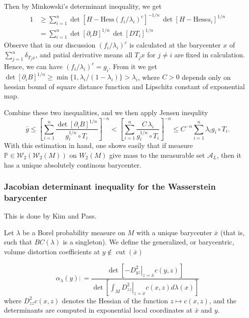 Then by Minkowski's determinant inequality, we get
\begin{align*}
	1 & \geq \sum_{i=1}^{n} \det [H-\text{Hess}(f_i/\lambda_i)^c]^{-1/n}\,\det[H-\text{Hess}u_i]^{1/n} \\
	  & =\sum_{i=1}^n \det[\partial_i B]^{1/n}\,\det[DT_i]^{1/n}
\end{align*}
Observe that in our discussion $(f_i / \lambda_i)^c$ is calculated at the barycenter $x$ of $\sum_{j=1}^{n} \delta_{T_j x}$,
and patial derivative means all $T_j x$ for $ j \ne i$ are fixed in calculation.
Hence, we can have $(f_i / \lambda_i)^c = g_i$.
From it we get $\det[\partial_i B]^{1/n} \geq \min \{1, \lambda_i / (1 - \lambda_i)\} > \lambda_i$,
where $C > 0$ depends only on hessian bound of square distance function and Lipschitz constant of exponential map.

Combine these two inequalities, and we then apply Jensen inequlity
\[
	\bar{g} \leq
	\left[ \sum_{i=1}^n \frac{\det[\partial_i B]^{1/n}}
	{g_i^{1/n} \circ T_i}\right]^{-n}
	< \left[ \sum_{i=1}^n \frac{C \, \lambda_i}
	{g_i^{1/n} \circ T_i}\right]^{-n}
	\leq C^{-n} \sum_{i=1}^n \lambda_i g_i \circ T_i.
\]
With this estimation in hand,
one shows easily that if measure $\mathbb{P} \in \mathcal{W}_2(\mathcal{W}_2(M))$ on $W_2(M)$ give mass to the measurable set $\mathcal{A}_L$,
then it has a unique absolutely continous barycenter.

\subsubsection{Jacobian determinant inequality for the Wasserstein barycenter}

This is done by Kim and Pass.
\begin{defn}
	Let \( \lambda \) be a Borel probability measure on \( M \) with a
	unique barycenter \( \bar { x } \) (that is, such that \( B C ( \lambda ) \) is a singleton). We define the generalized,
	or barycentric, volume distortion coefficients at \( y \notin \operatorname { cut } ( \bar { x } ) \)

	\[ \alpha _ { \lambda } ( y ) : = \frac { \operatorname { det } \left[ - \left. D _ { y z } ^ { 2 } \right| _ { z = \bar { x } } c ( y , z ) \right] } { \operatorname { det } \left[ \left. \int _ { M } D _ { z z } ^ { 2 } \right| _ { z = \bar { x } } c ( x , z ) d \lambda ( x ) \right] } \]
	where \( D _ { z z } ^ { 2 } c ( x , z ) \) denotes the Hessian of the function \( z \mapsto c ( x , z ) \), and the determinants
	are computed in exponential local coordinates at \( \bar { x } \) and \( y . \)
\end{defn}

